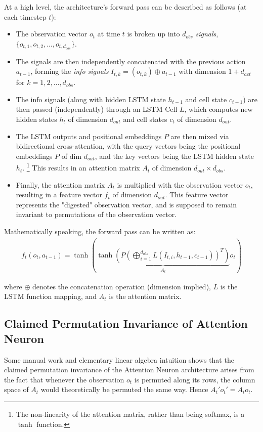 \documentclass{article}
\begin{document}
At a high level, the architecture's forward pass can be described as follows (at each timestep $t$):
\begin{itemize}
    \item The observation vector $o_t$ at time $t$ is broken up into 
    $d_{obs}$ \textit{signals}, $\{o_{t,1}, o_{t,2}, \ldots, o_{t,d_{obs}}\}$.
    \item The signals are then independently concatenated with the previous action $a_{t-1}$,
    forming the \textit{info signals} $I_{t,k} = (o_{t,k}) \oplus a_{t-1}$ with dimension $1 + d_{act}$ for $k = 1, 2, \ldots, d_{obs}$.
    \item The info signals (along with hidden LSTM state $h_{t-1}$ and cell state $c_{t-1}$) are then passed (independently) through an LSTM Cell $L$,
        which computes new hidden states $h_t$ of dimension $d_{out}$ and cell states $c_t$ of dimension $d_{out}$.
    \item The LSTM outputs and positional embeddings $P$ are then mixed via bidirectional cross-attention,
        with the query vectors being the positional embeddings $P$ of dim $d_{out}$,
        and the key vectors being the LSTM hidden state $h_t$. 
        \footnote{
            The non-linearity of the attention matrix, rather than being softmax,
            is a $\tanh$ function.
        }
        This results in an attention matrix $A_t$ of dimension $d_{out} \times d_{obs}$.
    \item Finally, the attention matrix $A_t$ is multiplied with the observation vector $o_t$,
        resulting in a feature vector $f_t$ of dimension $d_{out}$. This feature vector
        represents the "digested" observation vector, and is supposed to remain invariant
        to permutations of the observation vector.
\end{itemize}

Mathematically speaking, the forward pass can be written as:
\begin{align*}
    f_t(o_t, a_{t-1}) = \tanh\left(\underbrace{\tanh\left(P\left(\bigoplus_{i=1}^{d_{obs}} L(I_{t,i}, h_{t-1}, c_{t-1})\right)^T\right)}_{A_t} o_t\right)
\end{align*}

where $\oplus$ denotes the concatenation operation (dimension implied), 
$L$ is the LSTM function mapping, and $A_t$ is the attention matrix.

\subsection{Claimed Permutation Invariance of Attention Neuron}
Some manual work and elementary linear algebra intuition shows that the claimed
permutation invariance of the Attention Neuron architecture arises from the fact that
whenever the observation $o_t$ is permuted along its rows, the column space of $A_t$ would theoretically
be permuted the same way. Hence $A_t' o_t' = A_t o_t$.
\end{document}
